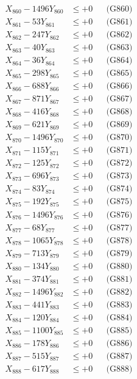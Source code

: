 \documentclass[a4paper,10pt]{article}
\begin{document}
{\begin{align}
X_{860} - 1496Y_{860} &\leq +0 && \text{(G860)} \\
\allowbreak
X_{861} - 53Y_{861} &\leq +0 && \text{(G861)} \\
X_{862} - 247Y_{862} &\leq +0 && \text{(G862)} \\
X_{863} - 40Y_{863} &\leq +0 && \text{(G863)} \\
X_{864} - 36Y_{864} &\leq +0 && \text{(G864)} \\
X_{865} - 298Y_{865} &\leq +0 && \text{(G865)} \\
X_{866} - 688Y_{866} &\leq +0 && \text{(G866)} \\
X_{867} - 871Y_{867} &\leq +0 && \text{(G867)} \\
X_{868} - 416Y_{868} &\leq +0 && \text{(G868)} \\
X_{869} - 621Y_{869} &\leq +0 && \text{(G869)} \\
X_{870} - 1496Y_{870} &\leq +0 && \text{(G870)} \\
\allowbreak
X_{871} - 115Y_{871} &\leq +0 && \text{(G871)} \\
X_{872} - 125Y_{872} &\leq +0 && \text{(G872)} \\
X_{873} - 696Y_{873} &\leq +0 && \text{(G873)} \\
X_{874} - 83Y_{874} &\leq +0 && \text{(G874)} \\
X_{875} - 192Y_{875} &\leq +0 && \text{(G875)} \\
X_{876} - 1496Y_{876} &\leq +0 && \text{(G876)} \\
X_{877} - 68Y_{877} &\leq +0 && \text{(G877)} \\
X_{878} - 1065Y_{878} &\leq +0 && \text{(G878)} \\
X_{879} - 713Y_{879} &\leq +0 && \text{(G879)} \\
X_{880} - 134Y_{880} &\leq +0 && \text{(G880)} \\
\allowbreak
X_{881} - 374Y_{881} &\leq +0 && \text{(G881)} \\
X_{882} - 1496Y_{882} &\leq +0 && \text{(G882)} \\
X_{883} - 441Y_{883} &\leq +0 && \text{(G883)} \\
X_{884} - 120Y_{884} &\leq +0 && \text{(G884)} \\
X_{885} - 1100Y_{885} &\leq +0 && \text{(G885)} \\
X_{886} - 178Y_{886} &\leq +0 && \text{(G886)} \\
X_{887} - 515Y_{887} &\leq +0 && \text{(G887)} \\
X_{888} - 617Y_{888} &\leq +0 && \text{(G888)} \\

\end{align}}
\end{document}
